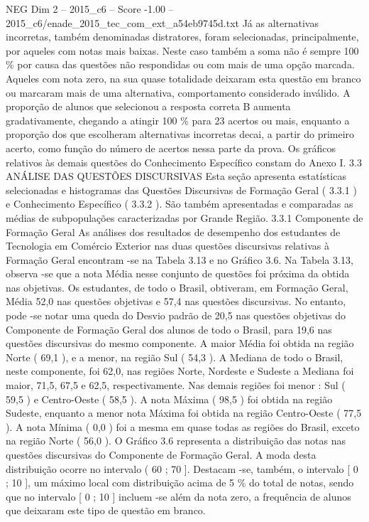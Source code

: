 \begin{textsample}{NEG Dim 2 – 2015\_c6 – Score -1.00 – 2015\_c6/enade\_2015\_tec\_com\_ext\_a54eb9745d.txt}
Já as alternativas incorretas, também denominadas distratores, foram selecionadas, principalmente, por aqueles com notas mais baixas.
Neste caso também a soma não é sempre 100 \% por causa das questões não respondidas ou com mais de uma opção marcada.
Aqueles com nota zero, na sua quase totalidade deixaram esta questão em branco ou marcaram mais de uma alternativa, comportamento considerado inválido.
A proporção de alunos que selecionou a resposta correta B aumenta gradativamente, chegando a atingir 100 \% para 23 acertos ou mais, enquanto a proporção dos que escolheram alternativas incorretas decai, a partir do primeiro acerto, como função do número de acertos nessa parte da prova.
Os gráficos relativos às demais questões do Conhecimento Específico constam do Anexo I. 3.3 ANÁLISE DAS QUESTÕES DISCURSIVAS Esta seção apresenta estatísticas selecionadas e histogramas das Questões Discursivas de Formação Geral ( 3.3.1 ) e Conhecimento Específico ( 3.3.2 ).
São também apresentadas e comparadas as médias de subpopulações caracterizadas por Grande Região. 3.3.1 Componente de Formação Geral As análises dos resultados de desempenho dos estudantes de Tecnologia em Comércio Exterior nas duas questões discursivas relativas à Formação Geral encontram -se na Tabela 3.13 e no Gráfico 3.6.
Na Tabela 3.13, observa -se que a nota Média nesse conjunto de questões foi próxima da obtida nas objetivas.
Os estudantes, de todo o Brasil, obtiveram, em Formação Geral, Média 52,0 nas questões objetivas e 57,4 nas questões discursivas.
No entanto, pode -se notar uma queda do Desvio padrão de 20,5 nas questões objetivas do Componente de Formação Geral dos alunos de todo o Brasil, para 19,6 nas questões discursivas do mesmo componente.
A maior Média foi obtida na região Norte ( 69,1 ), e a menor, na região Sul ( 54,3 ).
A Mediana de todo o Brasil, neste componente, foi 62,0, nas regiões Norte, Nordeste e Sudeste a Mediana foi maior, 71,5, 67,5 e 62,5, respectivamente.
Nas demais regiões foi menor : Sul ( 59,5 ) e Centro-Oeste ( 58,5 ).
A nota Máxima ( 98,5 ) foi obtida na região Sudeste, enquanto a menor nota Máxima foi obtida na região Centro-Oeste ( 77,5 ).
A nota Mínima ( 0,0 ) foi a mesma em quase todas as regiões do Brasil, exceto na região Norte ( 56,0 ).
O Gráfico 3.6 representa a distribuição das notas nas questões discursivas do Componente de Formação Geral.
A moda desta distribuição ocorre no intervalo ( 60 ; 70 ].
Destacam -se, também, o intervalo [ 0 ; 10 ], um máximo local com distribuição acima de 5 \% do total de notas, sendo que no intervalo [ 0 ; 10 ] incluem -se além da nota zero, a frequência de alunos que deixaram este tipo de questão em branco.

\end{textsample}
